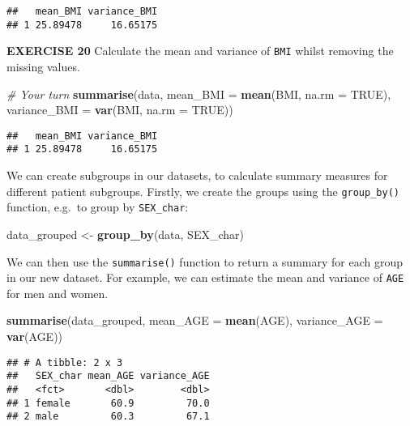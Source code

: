 \documentclass[
]{article}
\newenvironment{Shaded}{\begin{snugshade}}{\end{snugshade}}
\newcommand{\CommentTok}[1]{\textcolor[rgb]{0.56,0.35,0.01}{\textit{#1}}}
\newcommand{\DataTypeTok}[1]{\textcolor[rgb]{0.13,0.29,0.53}{#1}}
\newcommand{\KeywordTok}[1]{\textcolor[rgb]{0.13,0.29,0.53}{\textbf{#1}}}
\newcommand{\NormalTok}[1]{#1}
\newcommand{\OtherTok}[1]{\textcolor[rgb]{0.56,0.35,0.01}{#1}}
\newcommand{\StringTok}[1]{\textcolor[rgb]{0.31,0.60,0.02}{#1}}
\begin{document}
\begin{verbatim}
##   mean_BMI variance_BMI
## 1 25.89478     16.65175
\end{verbatim}

\textbf{EXERCISE 20} Calculate the mean and variance of \texttt{BMI}
whilst removing the missing values.

\begin{Shaded}
\begin{Highlighting}[]
\CommentTok{# Your turn}
\KeywordTok{summarise}\NormalTok{(data, }\DataTypeTok{mean_BMI =} \KeywordTok{mean}\NormalTok{(BMI, }\DataTypeTok{na.rm =} \OtherTok{TRUE}\NormalTok{), }
          \DataTypeTok{variance_BMI =} \KeywordTok{var}\NormalTok{(BMI, }\DataTypeTok{na.rm =} \OtherTok{TRUE}\NormalTok{))}
\end{Highlighting}
\end{Shaded}

\begin{verbatim}
##   mean_BMI variance_BMI
## 1 25.89478     16.65175
\end{verbatim}

We can create subgroups in our datasets, to calculate summary measures
for different patient subgroups. Firstly, we create the groups using the
\texttt{group\_by()} function, e.g.~to group by \texttt{SEX\_char}:

\begin{Shaded}
\begin{Highlighting}[]
\NormalTok{data_grouped <-}\StringTok{ }\KeywordTok{group_by}\NormalTok{(data, SEX_char)}
\end{Highlighting}
\end{Shaded}

We can then use the \texttt{summarise()} function to return a summary
for each group in our new dataset. For example, we can estimate the mean
and variance of \texttt{AGE} for men and women.

\begin{Shaded}
\begin{Highlighting}[]
\KeywordTok{summarise}\NormalTok{(data_grouped, }\DataTypeTok{mean_AGE =} \KeywordTok{mean}\NormalTok{(AGE), }\DataTypeTok{variance_AGE =} \KeywordTok{var}\NormalTok{(AGE))}
\end{Highlighting}
\end{Shaded}

\begin{verbatim}
## # A tibble: 2 x 3
##   SEX_char mean_AGE variance_AGE
##   <fct>       <dbl>        <dbl>
## 1 female       60.9         70.0
## 2 male         60.3         67.1
\end{verbatim}
\end{document}
